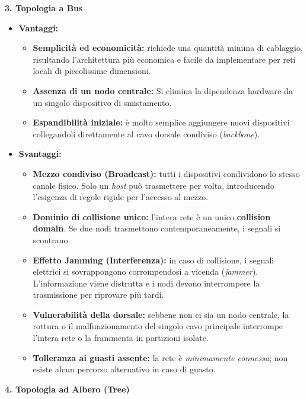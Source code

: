 \documentclass[a4paper,12pt]{report}
\begin{document}
\vspace{1cm}
\textbf{3. Topologia a Bus}
\begin{itemize}[leftmargin=*]
  \item \textbf{Vantaggi:}
  \begin{itemize}
    \item \textbf{Semplicità ed economicità:} richiede una quantità minima di cablaggio, risultando l'architettura più economica e facile da implementare per reti locali di piccolissime dimensioni.
    \item \textbf{Assenza di un nodo centrale:} Si elimina la dipendenza hardware da un singolo dispositivo di smistamento.
    \item \textbf{Espandibilità iniziale:} è molto semplice aggiungere nuovi dispositivi collegandoli direttamente al cavo dorsale condiviso (\textit{backbone}).
  \end{itemize}
  
  \item \textbf{Svantaggi:}
  \begin{itemize}
    \item \textbf{Mezzo condiviso (Broadcast):} tutti i dispositivi condividono lo stesso canale fisico. Solo un \textit{host} può trasmettere per volta, introducendo l'esigenza di regole rigide per l'accesso al mezzo.
    \item \textbf{Dominio di collisione unico:} l'intera rete è un unico \textbf{collision domain}. Se due nodi trasmettono contemporaneamente, i segnali si scontrano.
    \item \textbf{Effetto Jamming (Interferenza):} in caso di collisione, i segnali elettrici si sovrappongono corrompendosi a vicenda (\textit{jammer}). L'informazione viene distrutta e i nodi devono interrompere la trasmissione per riprovare più tardi.
    \item \textbf{Vulnerabilità della dorsale:} sebbene non ci sia un nodo centrale, la rottura o il malfunzionamento del singolo cavo principale interrompe l'intera rete o la frammenta in partizioni isolate.
    \item \textbf{Tolleranza ai guasti assente:} la rete è \textit{minimamente connessa}; non esiste alcun percorso alternativo in caso di guasto.
  \end{itemize}
\end{itemize}
\newpage
\textbf{4. Topologia ad Albero (Tree)}
\end{document}
